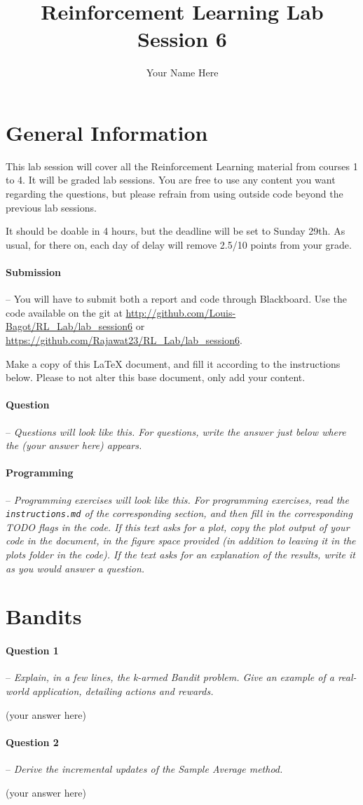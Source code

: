 \documentclass[a4paper]{article}
\title{Reinforcement Learning Lab Session 6}
\author{Your Name Here}
\newcommand{\question}[2]{
\paragraph{Question #1} -- \textit{#2}

}
\newcommand{\programming}[1]{
\paragraph{Programming} -- \textit{#1}

}
\begin{document}
\maketitle
\section*{General Information}
This lab session will cover all the Reinforcement Learning material from courses 1 to 4. It will be graded lab sessions. You are free to use any content you want regarding the questions, but please refrain from using outside code beyond the previous lab sessions.

It should be doable in 4 hours, but the deadline will be set to Sunday 29th. As usual, for there on, each day of delay will remove 2.5/10 points from your grade.

\paragraph{Submission} --
You will have to submit both a report and code through Blackboard. Use the code available on the git at \url{http://github.com/Louis-Bagot/RL_Lab/lab_session6} or \url{https://github.com/Rajawat23/RL_Lab/lab_session6}.

Make a copy of this LaTeX document, and fill it according to the instructions below. Please to not alter this base document, only add your content.

\question{}{Questions will look like this. For questions, write the answer just below where the (your answer here) appears.}
\programming{Programming exercises will look like this. For programming exercises, read the \texttt{instructions.md} of the corresponding section, and then fill in the corresponding TODO flags in the code. If this text asks for a plot, copy the plot output of your code in the document, in the figure space provided (in addition to leaving it in the plots folder in the code). If the text asks for an explanation of the results, write it as you would answer a question.}

\tableofcontents
\newpage

\section{Bandits}
\question{1}{Explain, in a few lines, the k-armed Bandit problem. Give an example of a real-world application, detailing actions and rewards.}
(your answer here)

\question{2}{Derive the incremental updates of the Sample 
Average method.}
(your answer here)
\end{document}
